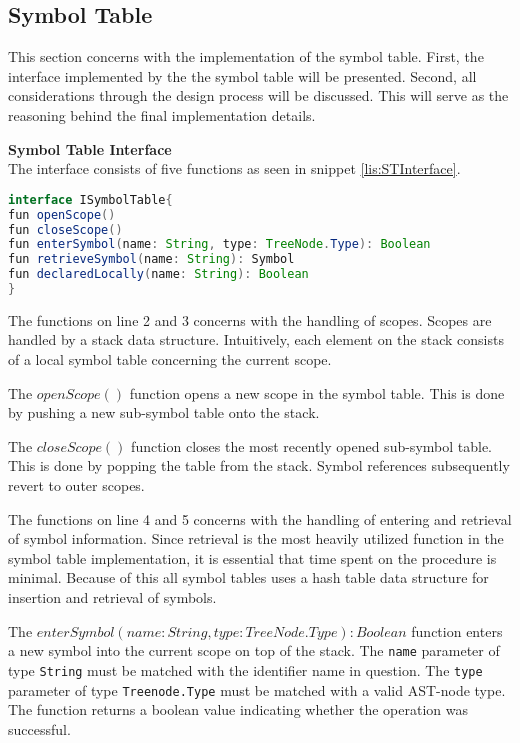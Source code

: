 \subsection{Symbol Table}
This section concerns with the implementation of the symbol table. 
First, the interface implemented by the the symbol table will be presented.
Second, all considerations through the design process will be discussed.
This will serve as the reasoning behind the final implementation details.

\textbf{Symbol Table Interface}\\
The interface consists of five functions as seen in snippet \ref{lis:STInterface}.

\begin{lstlisting}[language=java,label=lis:STInterface,caption=The interface which all symbol table implementations must implement.]
interface ISymbolTable{
fun openScope()
fun closeScope()
fun enterSymbol(name: String, type: TreeNode.Type): Boolean
fun retrieveSymbol(name: String): Symbol
fun declaredLocally(name: String): Boolean
}
\end{lstlisting}

The functions on line 2 and 3 concerns with the handling of scopes.
Scopes are handled by a stack data structure.
Intuitively, each element on the stack consists of a local symbol table concerning the current scope.

The $openScope()$ function opens a new scope in the symbol table.
This is done by pushing a new sub-symbol table onto the stack.

The $closeScope()$ function closes the most recently opened sub-symbol table.
This is done by popping the table from the stack.
Symbol references subsequently revert to outer scopes.

The functions on line 4 and 5 concerns with the handling of entering and retrieval of symbol information.
Since retrieval is the most heavily utilized function in the symbol table implementation, it is essential that time spent on the procedure is minimal.
Because of this all symbol tables uses a hash table data structure for insertion and retrieval of symbols. 

The $enterSymbol(name: String, type: TreeNode.Type): Boolean$ function enters a new symbol into the current scope on top of the stack.
The \texttt{name} parameter of type \texttt{String} must be matched with the identifier name in question.
The \texttt{type} parameter of type \texttt{Treenode.Type} must be matched with a valid AST-node type.
The function returns a boolean value indicating whether the operation was successful.

